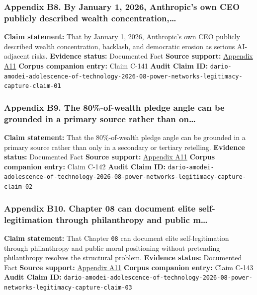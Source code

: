 \documentclass[
  american,
  11pt,
  letterpaper,
]{article}
\begin{document}
\subsubsection{Appendix B8. By January 1, 2026, Anthropic's own CEO
publicly described wealth
concentration,\ldots{}}\label{appendix-b8-by-january-1-2026-anthropic-s-own-ceo-publicly-described-wealth-concentration}

\textbf{Claim statement:} That by January 1, 2026, Anthropic's own CEO
publicly described wealth concentration, backlash, and democratic
erosion as serious AI-adjacent risks. \textbf{Evidence status:}
Documented Fact \textbf{Source support:}
\hyperref[appendix-a11-the-adolescence-of-technology]{Appendix A11}
\textbf{Corpus companion entry:} Claim C-141 \textbf{Audit Claim ID:}
\texttt{dario-amodei-adolescence-of-technology-2026-08-power-networks-legitimacy-capture-claim-01}

\subsubsection{Appendix B9. The 80\%-of-wealth pledge angle can be
grounded in a primary source rather than
on\ldots{}}\label{appendix-b9-the-80-of-wealth-pledge-angle-can-be-grounded-in-a-primary-source-rather-than-on}

\textbf{Claim statement:} That the 80\%-of-wealth pledge angle can be
grounded in a primary source rather than only in a secondary or tertiary
retelling. \textbf{Evidence status:} Documented Fact \textbf{Source
support:} \hyperref[appendix-a11-the-adolescence-of-technology]{Appendix
A11} \textbf{Corpus companion entry:} Claim C-142 \textbf{Audit Claim
ID:}
\texttt{dario-amodei-adolescence-of-technology-2026-08-power-networks-legitimacy-capture-claim-02}

\subsubsection{Appendix B10. Chapter 08 can document elite
self-legitimation through philanthropy and public
m\ldots{}}\label{appendix-b10-chapter-08-can-document-elite-self-legitimation-through-philanthropy-and-public-m}

\textbf{Claim statement:} That Chapter \texttt{08} can document elite
self-legitimation through philanthropy and public moral positioning
without pretending philanthropy resolves the structural problem.
\textbf{Evidence status:} Documented Fact \textbf{Source support:}
\hyperref[appendix-a11-the-adolescence-of-technology]{Appendix A11}
\textbf{Corpus companion entry:} Claim C-143 \textbf{Audit Claim ID:}
\texttt{dario-amodei-adolescence-of-technology-2026-08-power-networks-legitimacy-capture-claim-03}
\end{document}
